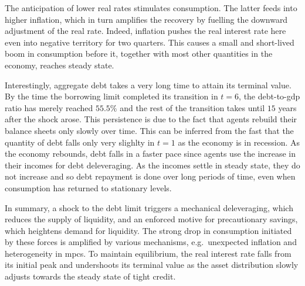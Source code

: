 \documentclass[12pt]{article} %
\numberwithin{equation}{section} %
\numberwithin{figure}{section}
\numberwithin{table}{section}
\begin{document}
The anticipation of lower real rates stimulates consumption. The latter feeds into higher inflation, which in turn amplifies the recovery by fuelling the downward adjustment of the real rate. Indeed, inflation pushes the real interest rate here even into negative territory for two quarters. This causes a small and short-lived boom in consumption before it, together with most other quantities in the economy, reaches steady state.

Interestingly, aggregate debt takes a very long time to attain its terminal value. By the time the borrowing limit completed its transition in $t=6$, the debt-to-\Gls{gdp} ratio has merely reached $55.5\%$ and the rest of the transition takes until $15$ years after the shock arose. This persistence is due to the fact that agents rebuild their balance sheets only slowly over time. This can be inferred from the fast that the quantity of debt falls only very slighlty in $t=1$ as the economy is in recession. As the economy rebounds, debt falls in a faster pace since agents use the increase in their incomes for debt deleveraging. As the incomes settle in steady state, they do not increase and so debt repayment is done over long periods of time, even when consumption has returned to stationary levels.

In summary, a shock to the debt limit triggers a mechanical deleveraging, which reduces the supply of liquidity, and an enforced motive for precautionary savings, which heightens demand for liquidity. The strong drop in consumption initiated by these forces is amplified by various mechanisms, e.g.~unexpected inflation and heterogeneity in \Gls{mpc}s. To maintain equilibrium, the real interest rate falls from its initial peak and undershoots its terminal value as the asset distribution slowly adjusts towards the steady state of tight credit.

\end{document}
